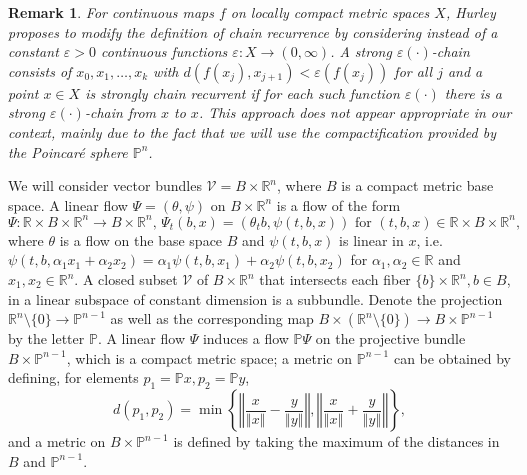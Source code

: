 \documentclass{siamltex}%
\newtheorem{remark}[theorem]{Remark}
\begin{document}
\begin{remark}
\label{Remark_Hurley}For continuous maps $f$ on locally compact metric spaces
$X$, Hurley \cite{Hurley92} proposes to modify the definition of chain
recurrence by considering instead of a constant $\varepsilon>0$ continuous
functions $\varepsilon:X\rightarrow(0,\infty)$. A strong $\varepsilon(\cdot
)$-chain consists of $x_{0},x_{1},\ldots,x_{k}$ with $d(f(x_{j}),x_{j+1}%
)<\varepsilon(f(x_{j}))$ for all $j$ and a point $x\in X$ is strongly chain
recurrent if for each such function $\varepsilon(\cdot)$ there is a strong
$\varepsilon(\cdot)$-chain from $x$ to $x$. This approach does not appear
appropriate in our context, mainly due to the fact that we will use the
compactification provided by the Poincar\'{e} sphere $\mathbb{P}^{n}$.
\end{remark}

We will consider vector bundles $\mathcal{V}=B\times\mathbb{R}^{n}$, where $B$
is a compact metric base space. A linear flow $\Psi=(\theta,\psi)$ on
$B\times\mathbb{R}^{n}$ is a flow of the form%
\[
\Psi:\mathbb{R}\times B\times\mathbb{R}^{n}\rightarrow B\times\mathbb{R}%
^{n},\,\Psi_{t}(b,x)=(\theta_{t}b,\psi(t,b,x))\text{ for }(t,b,x)\in
\mathbb{R}\times B\times\mathbb{R}^{n},
\]
where $\theta$ is a flow on the base space $B$ and $\psi(t,b,x)$ is linear in
$x$, i.e. $\psi(t,b,\alpha_{1}x_{1}+\alpha_{2}x_{2})=\alpha_{1}\psi
(t,b,x_{1})+\alpha_{2}\psi(t,b,x_{2})$ for $\alpha_{1},\alpha_{2}\in
\mathbb{R}$ and $x_{1},x_{2}\in\mathbb{R}^{n}$. A closed subset $\mathcal{V}$
of $B\times\mathbb{R}^{n}$ that intersects each fiber $\{b\}\times
\mathbb{R}^{n},b\in B$, in a linear subspace of constant dimension is a
subbundle. Denote the projection $\mathbb{R}^{n}\setminus\{0\}\rightarrow
\mathbb{P}^{n-1}$ as well as the corresponding map $B\times(\mathbb{R}%
^{n}\setminus\{0\})\rightarrow B\times\mathbb{P}^{n-1}$ by the letter
$\mathbb{P}$. A linear flow $\Psi$ induces a flow $\mathbb{P}\Psi$ on the
projective bundle $B\times\mathbb{P}^{n-1}$, which is a compact metric space;
a metric on $\mathbb{P}^{n-1}$ can be obtained by defining, for elements
$p_{1}=\mathbb{P}x,p_{2}=\mathbb{P}y$,%
\begin{equation}
d(p_{1},p_{2})=\min\left\{  \left\Vert \frac{x}{\left\Vert x\right\Vert
}-\frac{y}{\left\Vert y\right\Vert }\right\Vert ,\left\Vert \frac
{x}{\left\Vert x\right\Vert }+\frac{y}{\left\Vert y\right\Vert }\right\Vert
\right\}  , \label{metric_P}%
\end{equation}
and a metric on $B\times\mathbb{P}^{n-1}$ is defined by taking the maximum of
the distances in $B$ and $\mathbb{P}^{n-1}$.
\end{document}
